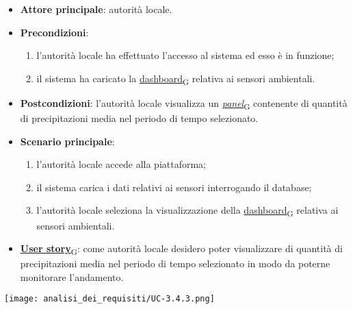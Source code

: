 \newpage
{}
\begin{itemize}
	\item \textbf{Attore principale}: autorità locale.
	\item \textbf{Precondizioni}:
	      \begin{enumerate}
		      \item l'autorità locale ha effettuato l'accesso al sistema ed esso è in funzione;
		      \item il sistema ha caricato la \href{https://7last.github.io/docs/pb/documentazione-interna/glossario\#dashboard}{dashboard\textsubscript{G}} relativa ai sensori ambientali.
	      \end{enumerate}
	\item \textbf{Postcondizioni}: l'autorità locale visualizza un \href{https://7last.github.io/docs/pb/documentazione-interna/glossario\#panel}{\textit{panel}\textsubscript{G}} contenente di quantità di precipitazioni media nel periodo di tempo selezionato.
	\item \textbf{Scenario principale}:
	      \begin{enumerate}
		      \item l'autorità locale accede alla piattaforma;
		      \item il sistema carica i dati relativi ai sensori interrogando il database;
		      \item l'autorità locale seleziona la visualizzazione della \href{https://7last.github.io/docs/pb/documentazione-interna/glossario\#dashboard}{dashboard\textsubscript{G}} relativa ai sensori ambientali.
	      \end{enumerate}
	\item \href{https://7last.github.io/docs/pb/documentazione-interna/glossario\#user-story}{\textbf{User story}\textsubscript{G}}: come autorità locale desidero poter visualizzare di quantità di precipitazioni media nel periodo di tempo selezionato
	      in modo da poterne monitorare l'andamento.
\end{itemize}
\begin{center}
	\texttt{[image: analisi\_dei\_requisiti/UC-3.4.3.png]}
\end{center}

